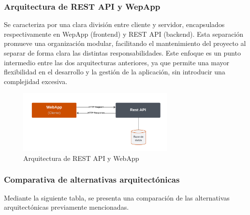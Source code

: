 \subsubsection{Arquitectura de REST API y WepApp}    
Se caracteriza por una clara división entre cliente y servidor, encapsulados respectivamente en WepApp (frontend) y REST API (backend). Esta separación promueve una organización modular, facilitando el mantenimiento del proyecto al separar de forma clara las distintas responsabilidades. 
Este enfoque es un punto intermedio entre las dos arquitecturas anteriores, ya que permite una mayor flexibilidad en el desarrollo y la gestión de la aplicación, sin introducir una complejidad excesiva. 
\begin{figure}[H]
    \centering
    \includegraphics[width=0.7\textwidth]{figures/4-Estudio-viabilidad/4_WebApp_RestApi.png}
    \caption{Arquitectura de REST API y WebApp}
    \label{fig:arquitectura_rest_api_webapp}
    \hypertarget{fig:arquitectura_rest_api_webapp}{}
\end{figure}

\subsubsection{Comparativa de alternativas arquitectónicas}
Mediante la siguiente tabla, se presenta una comparación de las alternativas arquitectónicas previamente mencionadas.

